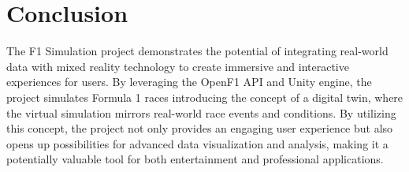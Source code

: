 \documentclass[
	a4paper, %
	10pt, %
	unnumberedsections, %
	twoside, %
]{LTJournalArticle}
\begin{document}
\section{Conclusion}
The F1 Simulation project demonstrates the potential of integrating real-world data with mixed reality technology to create immersive and interactive experiences for users. By leveraging the OpenF1 API and Unity engine, the project simulates Formula 1 races introducing the concept of a digital twin, where the virtual simulation mirrors real-world race events and conditions. By utilizing this concept, the project not only provides an engaging user experience but also opens up possibilities for advanced data visualization and analysis, making it a potentially valuable tool for both entertainment and professional applications.

\printbibliography
\end{document}

